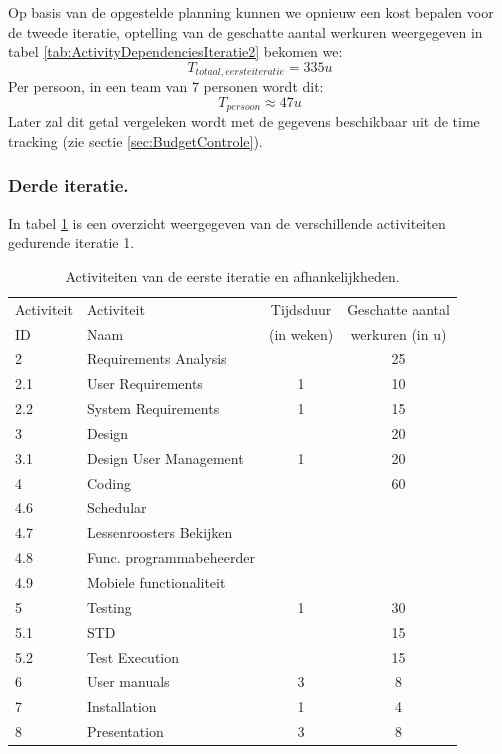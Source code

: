 Op basis van de opgestelde planning kunnen we opnieuw een kost bepalen voor de tweede iteratie, optelling van de geschatte aantal werkuren weergegeven in tabel \ref{tab:ActivityDependenciesIteratie2} bekomen we:
\begin{equation*}
	T_{totaal, eerste iteratie} = 335u
\end{equation*} 
Per persoon, in een team van 7 personen wordt dit:
\begin{equation*}
	T_{persoon} \approx 47u
\end{equation*}
Later zal dit getal vergeleken wordt met de gegevens beschikbaar uit de time tracking (zie sectie \ref{sec:BudgetControle}).


\subsubsection{Derde iteratie.}
In tabel \ref{tab:ActivityDependenciesIteratie3} is een overzicht weergegeven van de verschillende activiteiten gedurende iteratie 1.
\begin{table} [H]
	\centering
	\caption{Activiteiten van de eerste iteratie en afhankelijkheden.}
	\begin{tabular} {l|l|c|c}
		Activiteit & Activiteit & Tijdsduur & Geschatte aantal  \\
		ID & Naam & (in weken) & werkuren (in u) \\
		\hline
		2 	& Requirements Analysis 		&   & 25   	\\
		2.1 & User Requirements 			& 1 & 10  	\\
		2.2 & System Requirements 		& 1 & 15  	\\
		\hline
		3 	& Design 					&   & 20 	\\
		3.1 & Design User Management 	& 1 & 20 	\\
		\hline
		4 	& Coding 					&   & 60 	\\
		4.6 & Schedular					&	&		\\
		4.7 & Lessenroosters Bekijken	&	&		\\
		4.8 & Func. programmabeheerder	&	&		\\
		4.9 & Mobiele functionaliteit	&	&		\\
		\hline
		5 	& Testing 					& 1 & 30  	\\
		5.1 & STD						&   & 15  	\\
		5.2 & Test Execution				&   & 15  	\\
		\hline
		6 	& User manuals 				& 3 & 8  	\\
		\hline
		7 	& Installation 				& 1 & 4  	\\
		\hline
		8 	& Presentation 				& 3 & 8 		\\
	\end{tabular}
	\label{tab:ActivityDependenciesIteratie3}
\end{table}


